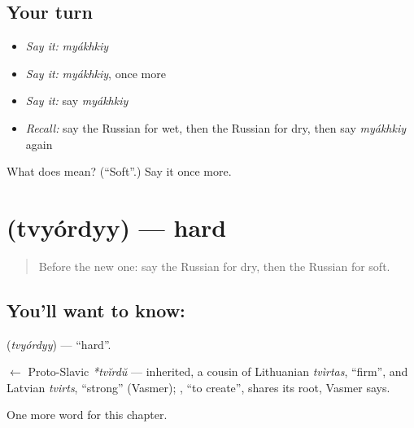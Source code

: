 \subsection*{Your turn}
\begin{itemize}
\raggedright
  \item \emph{Say it:} \emph{myákhkiy}
  \item \emph{Say it:} \emph{myákhkiy}, once more
  \item \emph{Say it:} say \emph{myákhkiy}
  \item \emph{Recall:} say the Russian for wet, then the Russian for dry, then say \emph{myákhkiy} again
\end{itemize}

\begin{tcolorbox}[breakable,colback=teal!4,colframe=teal!35!black,title={Before you move on}]
What does  mean? (\textquotedblleft{}Soft\textquotedblright{}.) Say it once more.
\end{tcolorbox}
\section[\texorpdfstring{\ru{твёрдый} (tvyórdyy)}{твёрдый (tvyórdyy)}]{ (tvyórdyy) — hard}

\label{lesson:RU-C129-hard}



\begin{quote}
Before the new one: say the Russian for dry, then the Russian for soft.
\end{quote}

\subsection*{You'll want to know: }
\textbf{} (\emph{tvyórdyy}) — \textquotedblleft{}hard\textquotedblright{}.

\begin{cousinweb}
\textbf{} $\leftarrow$ Proto-Slavic \emph{*tvĭrdŭ} — inherited, a cousin of Lithuanian \emph{tvìrtas}, \textquotedblleft{}firm\textquotedblright{}, and Latvian \emph{tvirts}, \textquotedblleft{}strong\textquotedblright{} (Vasmer); \emph{}, \textquotedblleft{}to create\textquotedblright{}, shares its root, Vasmer says.
\end{cousinweb}

\begin{grammarlens}[title={What you've built}]
One more word for this chapter.
\end{grammarlens}

